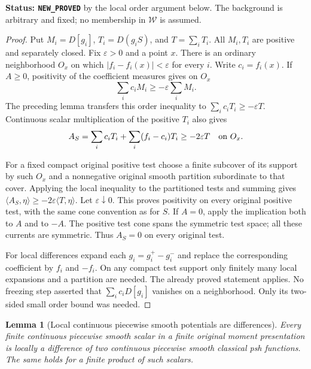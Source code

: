 \documentclass[11pt,a4paper]{article}
\numberwithin{equation}{section}
\newtheorem{lemma}[theorem]{Lemma}
\theoremstyle{definition}
\theoremstyle{remark}
\begin{document}
\noindent\textbf{Status: \texttt{NEW\_PROVED}} by the local order
argument below.  The background is arbitrary and fixed; no membership
in $\mathcal W$ is assumed.

\begin{proof}
Put $M_i=D[g_i]$, $T_i=D(g_iS)$, and $T=\sum_iT_i$.
All $M_i,T_i$ are positive and separately closed.  Fix
$\varepsilon>0$ and a point $x$.  There is an ordinary neighborhood
$O_x$ on which
$|f_i-f_i(x)|<\varepsilon$ for every $i$.  Write $c_i=f_i(x)$.
If $A\geq0$, positivity of the coefficient measures gives on $O_x$
\[
                         \sum_i c_iM_i\geq-\varepsilon\sum_iM_i.
\]
The preceding lemma transfers this order inequality to
$\sum_i c_iT_i\geq-\varepsilon T$.  Continuous scalar multiplication
of the positive $T_i$ also gives
\[
       A_S=\sum_i c_iT_i+\sum_i(f_i-c_i)T_i
                                                 \geq-2\varepsilon T
                           \quad\hbox{on }O_x.
\]

For a fixed compact original positive test choose a finite subcover
of its support by such $O_x$ and a nonnegative original smooth
partition subordinate to that cover.  Applying the local inequality
to the partitioned tests and summing gives
$\langle A_S,\eta\rangle\geq-2\varepsilon\langle T,\eta\rangle$.
Let $\varepsilon\downarrow0$.  This proves positivity on every
original positive test, with the same cone convention as for $S$.
If $A=0$, apply the implication both to $A$ and to $-A$.
The positive test cone spans the symmetric test space; all these
currents are symmetric.  Thus $A_S=0$ on every original test.

For local differences expand each $g_i=g_i^+-g_i^-$ and replace
the corresponding coefficient by $f_i$ and $-f_i$.  On any compact
test support only finitely many local expansions and a partition
are needed.  The already proved statement applies.  No freezing
step asserted that $\sum_i c_iD[g_i]$ vanishes on a neighborhood.
Only its two-sided small order bound was needed.
\end{proof}

\begin{lemma}[Local continuous piecewise smooth potentials are differences]
\label{lem:r6-continuous-pws-dsh}
Every finite continuous piecewise smooth scalar in a finite original
moment presentation is locally a difference of two continuous
piecewise smooth classical psh functions.  The same holds for a
finite product of such scalars.
\end{lemma}
\end{document}
